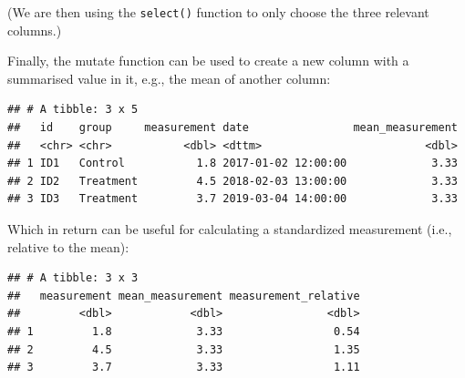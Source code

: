 \documentclass[
  12pt,
  krantz2]{krantz}
\makeatletter
\newenvironment{Shaded}{\begin{snugshade}}{\end{snugshade}}
\newcommand{\DataTypeTok}[1]{\textcolor[rgb]{0.13,0.29,0.53}{#1}}
\newcommand{\KeywordTok}[1]{\textcolor[rgb]{0.13,0.29,0.53}{\textbf{#1}}}
\newcommand{\NormalTok}[1]{#1}
\newcommand{\OperatorTok}[1]{\textcolor[rgb]{0.81,0.36,0.00}{\textbf{#1}}}
\newcommand{\StringTok}[1]{\textcolor[rgb]{0.31,0.60,0.02}{#1}}
\newenvironment{kframe}{%
\medskip{}
\setlength{\fboxsep}{.8em}
 \def\at@end@of@kframe{}%
 \ifinner\ifhmode%
  \def\at@end@of@kframe{\end{minipage}}%
  \begin{minipage}{\columnwidth}%
 \fi\fi%
 \def\FrameCommand##1{\hskip\@totalleftmargin \hskip-\fboxsep
 \colorbox{shadecolor}{##1}\hskip-\fboxsep
     \hskip-\linewidth \hskip-\@totalleftmargin \hskip\columnwidth}%
 \MakeFramed {\advance\hsize-\width
   \@totalleftmargin\z@ \linewidth\hsize
   \@setminipage}}%
 {\par\unskip\endMakeFramed%
 \at@end@of@kframe}
\renewenvironment{Shaded}{\begin{kframe}}{\end{kframe}}
\makeatother
\begin{document}
(We are then using the \texttt{select()} function to only choose the three relevant columns.)

Finally, the mutate function can be used to create a new column with a summarised value in it, e.g., the mean of another column:

\begin{Shaded}
\end{Shaded}

\begin{verbatim}
## # A tibble: 3 x 5
##   id    group     measurement date                mean_measurement
##   <chr> <chr>           <dbl> <dttm>                         <dbl>
## 1 ID1   Control           1.8 2017-01-02 12:00:00             3.33
## 2 ID2   Treatment         4.5 2018-02-03 13:00:00             3.33
## 3 ID3   Treatment         3.7 2019-03-04 14:00:00             3.33
\end{verbatim}

Which in return can be useful for calculating a standardized measurement (i.e., relative to the mean):

\begin{Shaded}
\end{Shaded}

\begin{verbatim}
## # A tibble: 3 x 3
##   measurement mean_measurement measurement_relative
##         <dbl>            <dbl>                <dbl>
## 1         1.8             3.33                 0.54
## 2         4.5             3.33                 1.35
## 3         3.7             3.33                 1.11
\end{verbatim}
\end{document}
